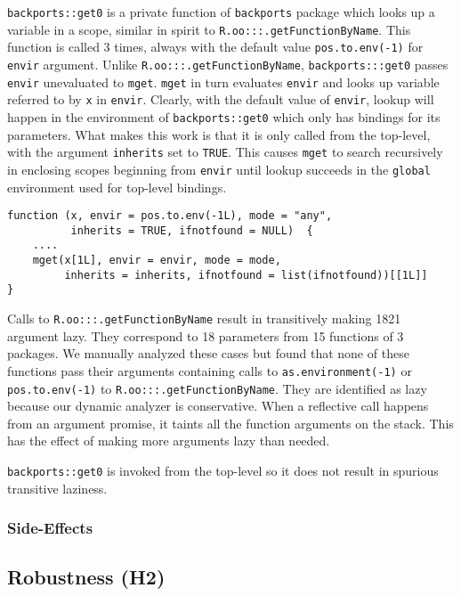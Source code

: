 \documentclass[review,nonacm,screen,acmsmall,anonymous=true]{acmart}
\newcommand{\code}[1]{\lstinline[style=R]|#1|\xspace}
\begin{document}
\code{backports::get0} is a private function of \code{backports} package which
looks up a variable in a scope, similar in spirit to
\code{R.oo:::.getFunctionByName}. This function is called 3 times, always with
the default value \code{pos.to.env(-1)} for \code{envir} argument. Unlike
\code{R.oo:::.getFunctionByName}, \code{backports:::get0} passes \code{envir}
unevaluated to \code{mget}. \code{mget} in turn evaluates \code{envir} and looks
up variable referred to by \code{x} in \code{envir}. Clearly, with the default
value of \code{envir}, lookup will happen in the environment of
\code{backports::get0} which only has bindings for its parameters. What makes
this work is that it is only called from the top-level, with the argument
\code{inherits} set to \code{TRUE}. This causes \code{mget} to search
recursively in enclosing scopes beginning from \code{envir} until lookup
succeeds in the \code{global} environment used for top-level bindings.

\begin{lstlisting}
function (x, envir = pos.to.env(-1L), mode = "any",
          inherits = TRUE, ifnotfound = NULL)  {
    ....
    mget(x[1L], envir = envir, mode = mode,
         inherits = inherits, ifnotfound = list(ifnotfound))[[1L]]
}
\end{lstlisting}

Calls to \code{R.oo:::.getFunctionByName} result in transitively making 1821
argument lazy. They correspond to 18 parameters from 15 functions of 3 packages.
We manually analyzed these cases but found that none of these functions pass
their arguments containing calls to \code{as.environment(-1)} or
\code{pos.to.env(-1)} to \code{R.oo:::.getFunctionByName}. They are identified
as lazy because our dynamic analyzer is conservative. When a reflective call
happens from an argument promise, it taints all the function arguments on the
stack. This has the effect of making more arguments lazy than needed.

\code{backports::get0} is invoked from the top-level so it does not result in
spurious transitive laziness.

\subsubsection{Side-Effects}

\subsection{Robustness (H2)} \label{Evaluation:Robustness}
\end{document}
